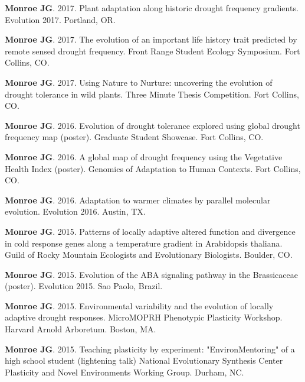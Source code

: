 \documentclass[12pt,english]{article}
\begin{document}
\begin{hangparas}{.5in}{1}
\hspace{1em}\textbf{Monroe JG}. 2017. Plant adaptation along historic drought frequency gradients. Evolution 2017. Portland, OR.
\vspace{0.5ex}\par
\hspace{1em}\textbf{Monroe JG}. 2017. The evolution of an important life history trait predicted by remote sensed drought frequency. Front Range Student Ecology Symposium. Fort Collins, CO.
\vspace{0.5ex}\par
\hspace{1em}\textbf{Monroe JG}. 2017. Using Nature to Nurture: uncovering the evolution of drought tolerance in wild plants. Three Minute Thesis Competition. Fort Collins, CO.
\vspace{0.5ex}\par
\hspace{1em}\textbf{Monroe JG}. 2016. Evolution of drought tolerance explored using global drought frequency map (poster). Graduate Student Showcase. Fort Collins, CO.
\vspace{0.5ex}\par
\hspace{1em}\textbf{Monroe JG}. 2016. A global map of drought frequency using the Vegetative Health Index (poster). Genomics of Adaptation to Human Contexts. Fort Collins, CO.
\vspace{0.5ex}\par
\hspace{1em}\textbf{Monroe JG}. 2016. Adaptation to warmer climates by parallel molecular evolution. Evolution 2016. Austin, TX.
\vspace{0.5ex}\par
\hspace{1em}\textbf{Monroe JG}. 2015. Patterns of locally adaptive altered function and divergence in cold response genes along a temperature gradient in Arabidopsis thaliana. Guild of Rocky Mountain Ecologists and Evolutionary Biologists. Boulder, CO.
\vspace{0.5ex}\par
\hspace{1em}\textbf{Monroe JG}. 2015. Evolution of the ABA signaling pathway in the Brassicaceae (poster). Evolution 2015. Sao Paolo, Brazil.
\vspace{0.5ex}\par
\hspace{1em}\textbf{Monroe JG}. 2015. Environmental variability and the evolution of locally adaptive drought responses. MicroMOPRH Phenotypic Plasticity Workshop. Harvard Arnold Arboretum. Boston, MA.
\vspace{0.5ex}\par
\hspace{1em}\textbf{Monroe JG}. 2015. Teaching plasticity by experiment: "EnvironMentoring" of a high school student (lightening talk) National Evolutionary Synthesis Center Plasticity and Novel Environments Working Group. Durham, NC.
\vspace{0.5ex}\par
\end{hangparas}
\end{document}
